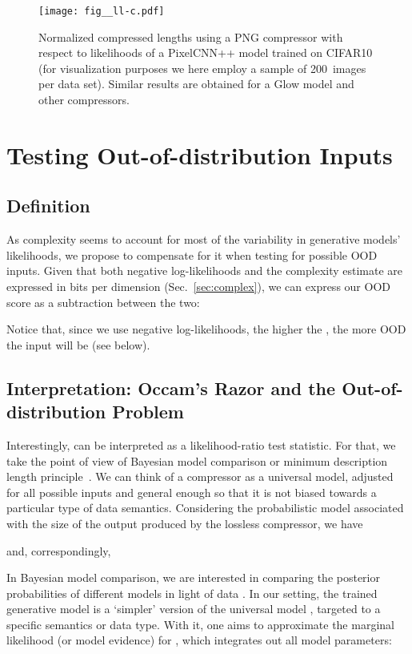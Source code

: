 \documentclass[letterpaper]{article} \usepackage{iclr2020_conference,times}
\begin{document}
\begin{figure}[t]
    \begin{center}
        \texttt{[image: fig\_\_ll-c.pdf]}
    \end{center}
    \caption{Normalized compressed lengths using a PNG compressor with respect to likelihoods of a PixelCNN++ model trained on CIFAR10 (for visualization purposes we here employ a sample of 200~images per data set). Similar results are obtained for a Glow model and other compressors.}
    \label{fig:correl}
\end{figure}



\section{Testing Out-of-distribution Inputs}
\label{sec:test}

\subsection{Definition}

As complexity seems to account for most of the variability in generative models' likelihoods, we propose to compensate for it when testing for possible OOD inputs. 
Given that both negative log-likelihoods  and the complexity estimate  are expressed in bits per dimension (Sec.~\ref{sec:complex}), we can express our OOD score as a subtraction between the two:

Notice that, since we use negative log-likelihoods, the higher the , the more OOD the input  will be (see below).

\subsection{Interpretation: Occam's Razor and the Out-of-distribution Problem}

Interestingly,  can be interpreted as a likelihood-ratio test statistic. For that, we take the point of view of Bayesian model comparison or minimum description length principle~\citep{mackay2003information}. We can think of a compressor  as a universal model, adjusted for all possible inputs and general enough so that it is not biased towards a particular type of data semantics. Considering the probabilistic model associated with the size of the output produced by the lossless compressor, we have

and, correspondingly,


In Bayesian model comparison, we are interested in comparing the posterior probabilities of different models in light of data .
In our setting, the trained generative model  is a `simpler' version of the universal model , targeted to a specific semantics or data type. With it, one aims to approximate the marginal likelihood (or model evidence) for , which integrates out all model parameters:
\end{document}
